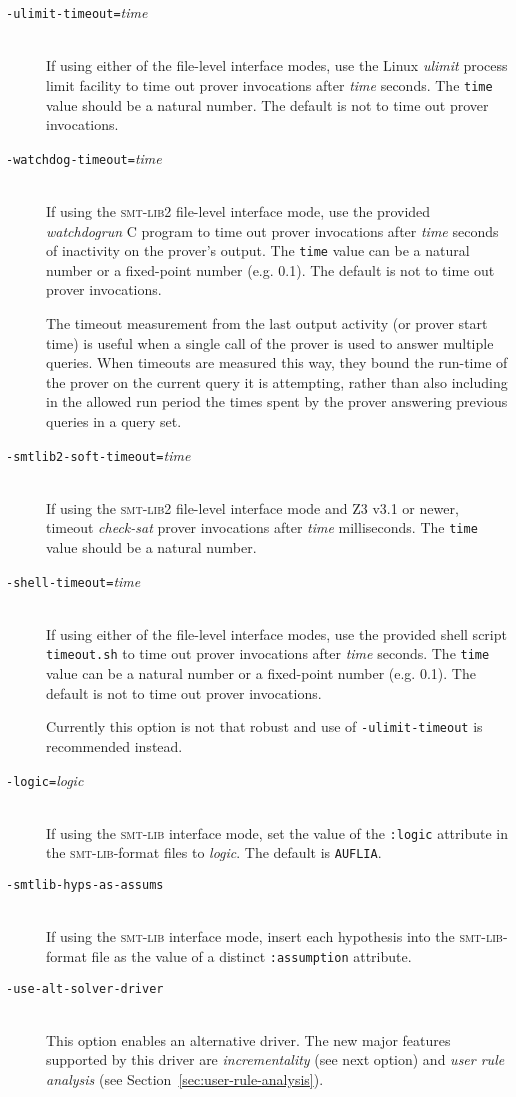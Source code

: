 \documentclass[12pt,fleqn]{article}
\newcommand{\zthree}{\textsc{Z}3}
\newcommand{\smtlib}{\textsc{smt-lib}}
\newcommand{\optionb}[1]{\item[\texttt{-{#1}}]\ \\}
\newcommand{\optionv}[2]{\item[\texttt{-{#1}=}\mdseries\textit{#2}]\ \\}
\begin{document}
\begin{description}
\optionv{ulimit-timeout}{time}
  If using either of the file-level interface modes, 
   use the Linux 
  \emph{ulimit} process limit facility to time out
  prover invocations after \emph{time} seconds.  The \texttt{time} value 
  should be a natural number.
  The default is not to time out prover invocations.

\optionv{watchdog-timeout}{time}
  If using the \smtlib{}2 file-level interface mode, use the provided
  \emph{watchdogrun} C program to time out prover invocations after
  \emph{time} seconds of inactivity on the prover's output.  The
  \texttt{time} value can be a natural number or a fixed-point
  number (e.g. 0.1).  The default is not to time out prover invocations.

  The timeout measurement from the last output activity (or prover
  start time) is useful when a single call of the prover is used to
  answer multiple queries.  When timeouts are measured this way, they
  bound the run-time of the prover on the current query it is
  attempting, rather than also including in the allowed run period the
  times spent by the prover answering previous queries in a query set.

\optionv{smtlib2-soft-timeout}{time}
 If using the \smtlib{}2 file-level interface mode and \zthree{} v3.1 or newer,
 timeout \emph{check-sat} prover invocations after \emph{time} milliseconds.
 The \texttt{time} value should be a natural number.

\optionv{shell-timeout}{time}
  If using either of the file-level interface modes, 
   use the provided shell script 
   \texttt{timeout.sh} to time out prover invocations after \emph{time} 
  seconds.  The \texttt{time} value can
  be a natural number or a fixed-point number (e.g. 0.1).
  The default is not to time out prover invocations.

  Currently this option is not that robust and use of \texttt{-ulimit-timeout}
  is recommended instead.

\optionv{logic}{logic}
  If using the \smtlib{} interface mode, set the value of the 
  \texttt{:logic} attribute in the \smtlib{}-format files to \emph{logic}.
  The default is \texttt{AUFLIA}.

\optionb{smtlib-hyps-as-assums}
  If using the \smtlib{} interface mode, insert each hypothesis into
  the \smtlib{}-format file as the value of a distinct 
  \texttt{:assumption} attribute.
  
\optionb{use-alt-solver-driver}
  This option enables an alternative driver.  The new
  major features supported by this driver are \emph{incrementality} (see
  next option) and \emph{user rule analysis} (see
  Section~\ref{sec:user-rule-analysis}).
  

\end{description}
\end{document}
